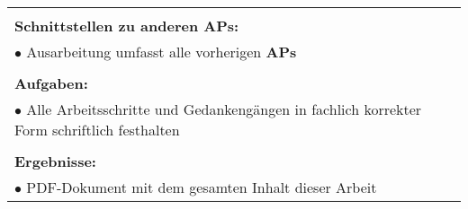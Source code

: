 \begin{table}[!h]
\begin{center}
\begin{tabular}{|p{35mm}||p{55mm}|p{50mm}||p{40mm}|}
			\multicolumn{4}{|p{150mm}|}{}\\
			\multicolumn{4}{|p{150mm}|}{\textbf{Schnittstellen zu anderen APs:}}\\
			\multicolumn{4}{|p{150mm}|}{$\bullet$ Ausarbeitung umfasst alle vorherigen \textbf{APs}}\\
			\multicolumn{4}{|p{150mm}|}{}\\
			\multicolumn{4}{|p{150mm}|}{\textbf{Aufgaben:}}\\
			\multicolumn{4}{|p{150mm}|}{$\bullet$ Alle Arbeitsschritte und Gedankengängen in fachlich korrekter Form schriftlich festhalten}\\
			\multicolumn{4}{|p{150mm}|}{}\\
			\multicolumn{4}{|p{150mm}|}{\textbf{Ergebnisse:}}\\
			\multicolumn{4}{|p{150mm}|}{$\bullet$ PDF-Dokument mit dem gesamten Inhalt dieser Arbeit}\\
			\hline
		\end{tabular}
	\end{center}
\end{table}

